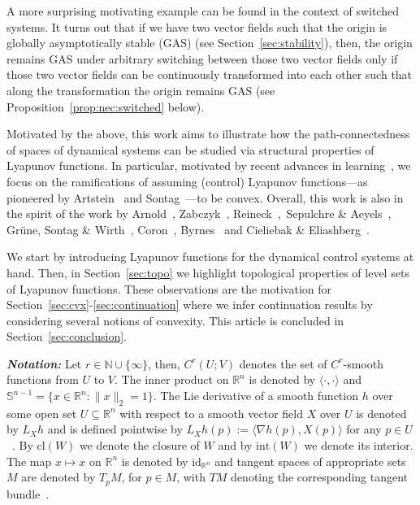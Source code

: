 \documentclass[letterpaper, 10 pt, conference]{ieeeconf}  %
\theoremstyle{mystyle}
\begin{document}
{A more surprising motivating example can be found in the context of switched systems. It turns out that if we have two vector fields such that the origin is globally asymptotically stable (GAS) (see Section~\ref{sec:stability}), then, the origin remains GAS under arbitrary switching between those two vector fields only if those two vector fields can be continuously transformed into each other such that along the transformation the origin remains GAS (see Proposition~\ref{prop:nec:switched} below).   

Motivated by the above, this work aims to illustrate how the path-connectedness of spaces of dynamical systems can be studied via structural properties of Lyapunov functions. In particular, motivated by recent advances in learning~\cite{ref:amos2017input,ref:kolter2019learning}, we focus on the ramifications of assuming (control) Lyapunov functions---as pioneered by Artstein~\cite{ref:artstein1983stabilization} and Sontag~\cite{ref:sontag1989universal}---to be convex. Overall, this work is also in the spirit of the work by Arnold~\cite[Sec.~22]{arnold1973ordinary}, Zabczyk~\cite{ref:zabczyk1989}, Reineck~\cite{ref:reineck1991continuation},~Sepulchre \& Aeyels~\cite{ref:sepulchre1996homogeneous}, Gr\"une, Sontag \& Wirth~\cite{grune1999asymptotic}, Coron~\cite[Ch.~11]{ref:coron2007control}, Byrnes~\cite{ref:byrnes2008brockett} and Cieliebak \& Eliashberg~\cite[Ch.~9]{ref:cieliebak2012stein}.
}

We start by introducing Lyapunov functions for the dynamical control systems at hand. Then, in Section~\ref{sec:topo} we highlight topological properties of level sets of Lyapunov functions. These observations are the motivation for Section~\ref{sec:cvx}-\ref{sec:continuation} where we infer continuation results by considering several notions of convexity. This article is concluded in Section~\ref{sec:conclusion}. 

\noindent\textit{\textbf{Notation:}} Let $r\in \mathbb{N}\cup \{\infty\}$, then, $C^r(U;V)$ denotes the set of $C^r$-smooth functions from $U$ to $V$. The inner product on $\mathbb{R}^n$ is denoted by $\langle \cdot , \cdot \rangle$ and $\mathbb{S}^{n-1}=\{x\in \mathbb{R}^n:\|x\|_2=1\}$. The Lie derivative of a smooth function $h$ over some open set $U\subseteq \mathbb{R}^n$ with respect to a smooth vector field $X$ over $U$ is denoted by $L_X h$ and is defined pointwise by $L_Xh(p):=\langle \nabla h(p), X(p)\rangle$ for any $p\in U$~\cite[Prop.~12.32]{Lee2}. By $\mathrm{cl}(W)$ we denote the closure of $W$ and by $\mathrm{int}(W)$ we denote its interior. The map $x\mapsto x$ on $\mathbb{R}^n$ is denoted by $\mathrm{id}_{\mathbb{R}^n}$ and tangent spaces of appropriate sets $M$ are denoted by $T_pM$, for $p\in M$, with $TM$ denoting the corresponding tangent bundle~\cite[p.~65]{Lee2}.      
\end{document}
